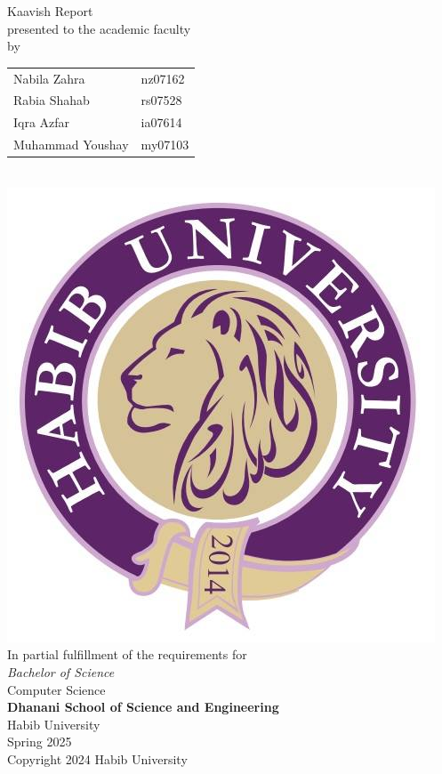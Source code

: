 \begin{titlepage}
  
  \begin{center}
    \vfill
    \textbf{\Huge \Title}
    \bigskip

    {\large Kaavish Report\\
      presented to the academic faculty\\
      by\\\bigskip
      \begin{tabular}{ll}
        Nabila Zahra & nz07162\\
        Rabia Shahab & rs07528\\
        Iqra Azfar & ia07614\\
        Muhammad Youshay & my07103\\
      \end{tabular}
    }\\\bigskip\bigskip\bigskip
    \includegraphics[width=.4\textwidth]{images/HU.jpg}\\
    {\large In partial fulfillment of the requirements for\\
      \textit{Bachelor of Science}\\
      Computer Science\\\medskip
      \textbf{Dhanani School of Science and Engineering}\\\medskip
      Habib University\\\smallskip
      Spring 2025
    }\\\vfill
    Copyright {\scriptsize \textcopyright} 2024 Habib University
  \end{center}
  \restoregeometry
\end{titlepage}

